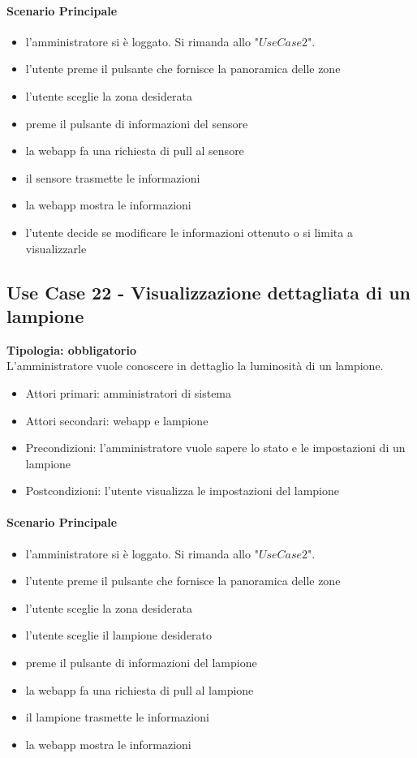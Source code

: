\documentclass[12pt]{article}
\begin{document}
\paragraph{Scenario Principale}
\begin{itemize}
	\item l'amministratore si è loggato. Si rimanda allo "$Use Case 2$".
	\item l'utente preme il pulsante che fornisce la panoramica delle zone
	\item l'utente sceglie la zona desiderata
	\item preme il pulsante di informazioni del sensore
	\item la webapp fa una richiesta di pull al sensore
	\item il sensore trasmette le informazioni
	\item la webapp mostra le informazioni
	\item l'utente decide se modificare le informazioni ottenuto o si limita a visualizzarle
\end{itemize}

\subsection{Use Case 22 - Visualizzazione dettagliata di un lampione}
\textbf{Tipologia: obbligatorio} \\
L'amministratore vuole conoscere in dettaglio la luminosità di un lampione.
\begin{itemize}
	\item Attori primari: amministratori di sistema
	\item Attori secondari: webapp e lampione
	\item Precondizioni: l'amministratore vuole sapere lo stato e le impostazioni di un lampione
	\item Postcondizioni: l'utente visualizza le impostazioni del lampione
\end{itemize}
\paragraph{Scenario Principale}
\begin{itemize}
	\item l'amministratore si è loggato. Si rimanda allo "$Use Case 2$".
	\item l'utente preme il pulsante che fornisce la panoramica delle zone
	\item l'utente sceglie la zona desiderata
	\item l'utente sceglie il lampione desiderato
	\item preme il pulsante di informazioni del lampione
	\item la webapp fa una richiesta di pull al lampione
	\item il lampione trasmette le informazioni
	\item la webapp mostra le informazioni
\end{itemize}
\end{document}
